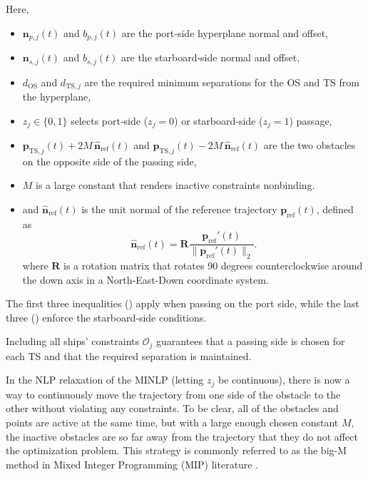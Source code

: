 Here,
\begin{itemize}
    \item $\mathbf{n}_{p,j}(t)$ and $b_{p,j}(t)$ are the port‐side hyperplane normal and offset,
    \item $\mathbf{n}_{s,j}(t)$ and $b_{s,j}(t)$ are the starboard‐side normal and offset,
    \item $d_{\text{OS}}$ and $d_{\text{TS},j}$ are the required minimum separations for the OS and TS from the hyperplane, 
    \item $z_j\in\{0,1\}$ selects port‐side ($z_j=0$) or starboard‐side ($z_j=1$) passage,
    \item $\mathbf{p}_{\mathrm{TS},j}(t)+2M\,\mathbf{\hat n}_{\mathrm{ref}}(t)$ and $\mathbf{p}_{\mathrm{TS},j}(t)-2M\,\mathbf{\hat n}_{\mathrm{ref}}(t)$ are the two obstacles on the opposite side of the passing side,
    \item $M$ is a large constant that renders inactive constraints nonbinding.
    \item and $\mathbf{\hat n}_{\mathrm{ref}}(t)$ is the unit normal of the reference trajectory $\mathbf p_\text{ref}(t)$, defined as
    \begin{equation}\label{eq:reference-normal}
        \mathbf{\hat n}_{\mathrm{ref}}(t) = \mathbf R\frac{\mathbf p_\text{ref}'(t)}{\|\mathbf p_\text{ref}'(t)\|_2}.
    \end{equation}
    where $\mathbf R$ is a rotation matrix that rotates 90 degrees counterclockwise around the down axis in a North-East-Down coordinate system.
\end{itemize}
The first three inequalities
()
apply when passing on the port side, while the last three
()
enforce the starboard‐side conditions.


Including all ships’ constraints $\mathcal{O}_j$ guarantees that a passing side is chosen for each TS and that the required separation is maintained.
    
In the NLP relaxation of the MINLP (letting $z_j$ be continuous), there is now a way to continuously move the trajectory from one side of the obstacle to the other without violating any constraints. To be clear, all of the obstacles and points are active at the same time, but with a large enough chosen constant $M$, the inactive obstacles are so far away from the trajectory that they do not affect the optimization problem. This strategy is commonly referred to as the big-M method in Mixed Integer Programming (MIP) literature \citep{gan2012adaptive,Cococcioni2020}.

